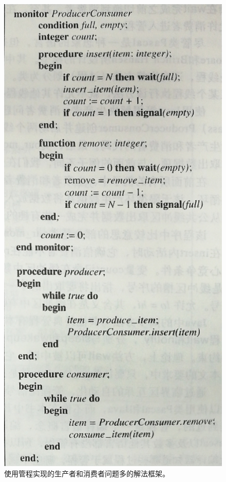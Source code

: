 \documentclass[UTF8,a4paper]{ctexart}
\begin{document}
      \begin{figure}[H]\centering
        \includegraphics[scale = 0.3]{assets/ModernOperatingSystems_061b9.png}
        \caption{使用管程实现的生产者和消费者问题多的解法框架。}
      \end{figure}
\end{document}
